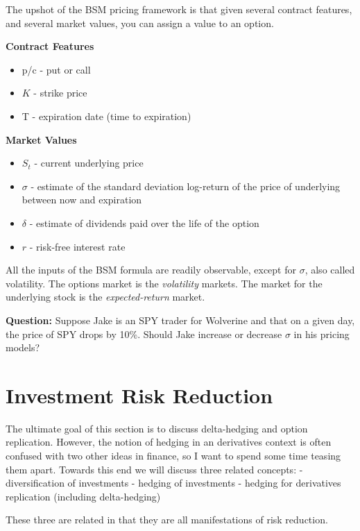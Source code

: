 \documentclass[11pt,]{krantz}
\begin{document}
The upshot of the BSM pricing framework is that given several contract features, and several market values, you can assign a value to an option.

\textbf{Contract Features}

\begin{itemize}
\item
  p/c - put or call
\item
  \(K\) - strike price
\item
  T - expiration date (time to expiration)
\end{itemize}

\textbf{Market Values}

\begin{itemize}
\item
  \(S_{t}\) - current underlying price
\item
  \(\sigma\) - estimate of the standard deviation log-return of the price of underlying between now and expiration
\item
  \(\delta\) - estimate of dividends paid over the life of the option
\item
  \(r\) - risk-free interest rate
\end{itemize}

All the inputs of the BSM formula are readily observable, except for \(\sigma\), also called volatility. The options market is the \emph{volatility} markets. The market for the underlying stock is the \emph{expected-return} market.

\textbf{Question:} Suppose Jake is an SPY trader for Wolverine and that on a given day, the price of SPY drops by 10\%. Should Jake increase or decrease \(\sigma\) in his pricing models?

\section{Investment Risk Reduction}\label{investment-risk-reduction}

The ultimate goal of this section is to discuss delta-hedging and option replication. However, the notion of hedging in an derivatives context is often confused with two other ideas in finance, so I want to spend some time teasing them apart. Towards this end we will discuss three related concepts: - diversification of investments - hedging of investments - hedging for derivatives replication (including delta-hedging) \vspace{10pt}

These three are related in that they are all manifestations of risk reduction.
\end{document}
